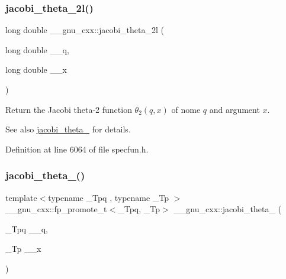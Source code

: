 \subsubsection{\texorpdfstring{jacobi\+\_\+theta\+\_\+2l()}{jacobi\_theta\_2l()}}
{\footnotesize\ttfamily long double \+\_\+\+\_\+gnu\+\_\+cxx\+::jacobi\+\_\+theta\+\_\+2l (\begin{DoxyParamCaption}\item[{long double}]{\+\_\+\+\_\+q,  }\item[{long double}]{\+\_\+\+\_\+x }\end{DoxyParamCaption})\hspace{0.3cm}{\ttfamily [inline]}}

Return the Jacobi theta-\/2 function $ \theta_2(q,x) $ of nome $ q $ and argument $ x $.

\begin{DoxySeeAlso}{See also}
\hyperlink{group__gnu__math__spec__func_gaf6b13dac1f112a870299d75cb4cf42cc}{jacobi\+\_\+theta\+\_} for details. 
\end{DoxySeeAlso}


Definition at line 6064 of file specfun.\+h.

\mbox{\label{group__gnu__math__spec__func_gaf4eac2990db1dadba66ae688ceaa6403}} 
\subsubsection{\texorpdfstring{jacobi\+\_\+theta\+\_()}{jacobi\_theta\_3()}}
{\footnotesize\ttfamily template$<$typename \+\_\+\+Tpq , typename \+\_\+\+Tp $>$ \\
\+\_\+\+\_\+gnu\+\_\+cxx\+::fp\+\_\+promote\+\_\+t$<$\+\_\+\+Tpq, \+\_\+\+Tp$>$ \+\_\+\+\_\+gnu\+\_\+cxx\+::jacobi\+\_\+theta\+\_ (\begin{DoxyParamCaption}\item[{\+\_\+\+Tpq}]{\+\_\+\+\_\+q,  }\item[{\+\_\+\+Tp}]{\+\_\+\+\_\+x }\end{DoxyParamCaption})\hspace{0.3cm}{\ttfamily [inline]}}

